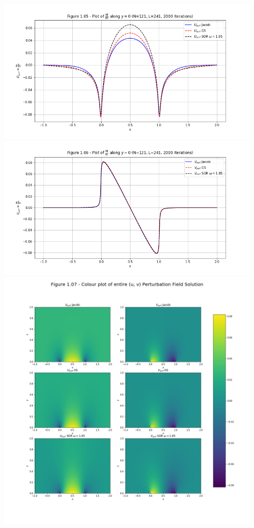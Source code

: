 \documentclass[12pt]{article}
\begin{document}
    \includegraphics[width=\textwidth]{fig1.05}
    \includegraphics[width=\textwidth]{fig1.06}
    \includegraphics[width=\textwidth]{fig1.07}
\end{document}

